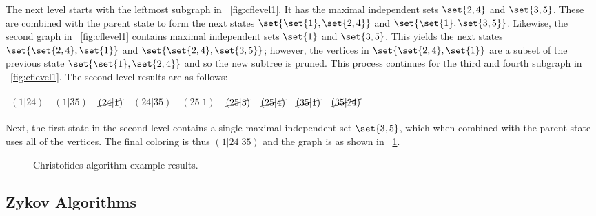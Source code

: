 The next level starts with the leftmost subgraph in \figurename~\ref{fig:cflevel1}.  It has the maximal independent
sets \(\set{2,4}\) and \(\set{3,5}\).  These are combined with the parent state to form the next states
\(\set{\set{1},\set{2,4}}\) and \(\set{\set{1},\set{3,5}}\).  Likewise, the second graph in
\figurename~\ref{fig:cflevel1} contains maximal independent sets \(\set{1}\) and \(\set{3,5}\).  This yields the
next states \(\set{\set{2,4},\set{1}}\) and \(\set{\set{2,4},\set{3,5}}\); however, the vertices in
\(\set{\set{2,4},\set{1}}\) are a subset of the previous state \(\set{\set{1},\set{2,4}}\) and so the new subtree
is pruned.  This process continues for the third and fourth subgraph in \figurename~\ref{fig:cflevel1}.  The second
level results are as follows:

\begin{tabular}{ccccccccc}
  \((1|24)\) & \((1|35)\) & \(\cancel{(24|1)}\) & \((24|35)\) & \((25|1)\) & \(\cancel{(25|3)}\) &
  \(\cancel{(25|4)}\) & \(\cancel{(35|1)}\) & \(\cancel{(35|24)}\)
\end{tabular}

Next, the first state in the second level contains a single maximal independent set \(\set{3,5}\), which when
combined with the parent state uses all of the vertices.  The final coloring is thus \((1|24|35)\) and the graph is
 as shown in \figurename~\ref{fig:cfresults}.

\begin{figure}[H]
  \centering
  \caption{Christofides algorithm example results.}
  \label{fig:cfresults}
\end{figure}

\subsection{Zykov Algorithms}\label{sec:sub:zykov}

